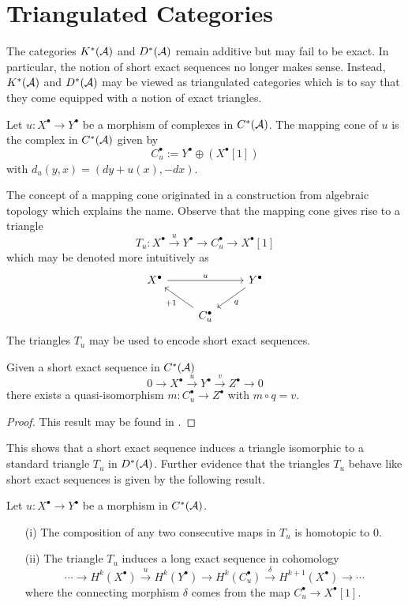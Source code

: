 \section{Triangulated Categories}
The categories $K^*(\AA)$ and $D^*(\AA)$ remain additive but may fail to be exact.
In particular, the notion of short exact sequences no longer makes sense.
Instead, $K^*(\AA)$ and $D^*(\AA)$ may be viewed as triangulated categories which is to say that they come equipped with a notion of exact triangles.
\begin{definition}
 Let $u:X^\bullet \to Y^\bullet$ be a morphism of complexes in $C^*(\AA)$.
 The mapping cone of $u$ is the complex in $C^*(\AA)$ given by
 $$C_u^\bullet := Y^\bullet \oplus (X^\bullet[1]) $$
 with $d_u(y,x)= (dy + u(x) , -dx)$.
\end{definition}
The concept of a mapping cone originated in a construction from algebraic topology which explains the name.
Observe that the mapping cone gives rise to a triangle
$$T_u:X^\bullet \xrightarrow{u} Y^\bullet \to C_u^\bullet \to X^\bullet[1]$$
which may be denoted more intuitively as
$$
 \begin{tikzcd}
   X^\bullet \arrow{rr}{u}& & Y^\bullet \arrow{dl}{q}\\
   & C_u^\bullet\arrow{lu}{+1}
 \end{tikzcd}
$$
The triangles $T_u$ may be used to encode short exact sequences.
\begin{proposition}\label{prop: SESYieldsTriangle}
Given a short exact sequence in $C^*(\AA)$
$$0 \to X^\bullet \xrightarrow{u} Y^\bullet \xrightarrow{v} Z^\bullet \to 0 $$
there exists a quasi-isomorphism $m:C_u^\bullet \to Z^\bullet$ with $m\circ q = v$.
\end{proposition}
\begin{proof}
  This result may be found in \cite[Chapter 1]{dimca2004sheaves}.
\end{proof}
This shows that a short exact sequence induces a triangle isomorphic to a standard triangle $T_u$ in $D^*(\AA)$.
Further evidence that the triangles $T_u$ behave like short exact sequences is given by the following result.
\begin{proposition}
 Let $u:X^\bullet \to Y^\bullet$ be a morphism in $C^*(\AA)$.
 \begin{enumerate}
   \item[(i)] The composition of any two consecutive maps in $T_u$ is homotopic to $0$.
   \item[(ii)] The triangle $T_u$ induces a long exact sequence in cohomology
   $$\cdots \to H^k(X^\bullet) \xrightarrow{u} H^k(Y^\bullet) \to H^k(C_u^\bullet) \xrightarrow{\delta} H^{k+1}(X^\bullet) \to \cdots$$
   where the connecting morphism $\delta$ comes from the map $C_u^\bullet \to X^\bullet[1]$.
 \end{enumerate}
\end{proposition}
